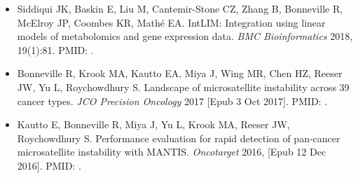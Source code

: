 \begin{vita}
\begin{publist}
\begin{itemize}
    \item Siddiqui JK, Baskin E, Liu M, Cantemir-Stone CZ, Zhang B, Bonneville R, McElroy JP, Coombes KR, Math\'e EA\@. IntLIM: Integration using linear models of metabolomics and gene expression data. \textit{BMC Bioinformatics} 2018, 19(1):81. PMID: .
    \item Bonneville R\cofirst, Krook MA\cofirst, Kautto EA, Miya J, Wing MR, Chen HZ, Reeser JW, Yu L, Roychowdhury S\@. Landscape of microsatellite instability across 39 cancer types. \textit{JCO Precision Oncology} 2017 [Epub 3 Oct 2017]. PMID: .
    \item Kautto E, Bonneville R, Miya J, Yu L, Krook MA, Reeser JW, Roychowdhury S\@. Performance evaluation for rapid detection of pan-cancer microsatellite instability with MANTIS. \textit{Oncotarget} 2016, [Epub 12 Dec 2016]. PMID: .
\end{itemize}

%

\end{publist}



\begin{fieldsstudy}

\majorfield*



\end{fieldsstudy}

\end{vita}

